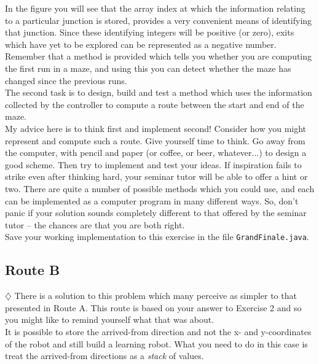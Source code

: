 \noindent
In the figure you will see that the array index at which the information relating
to a particular junction is stored, provides a very
convenient means of identifying that junction. Since these identifying
integers will be positive (or zero), exits which have yet to be explored can
be represented as a negative number. Remember that a method is
provided which tells you whether you are computing the first run
in a maze, and using this you can detect whether the maze has changed since 
the previous runs. \\

\noindent
The second task is to
design, build and test a method which uses the information collected by
the controller to compute a route between the start and end of the maze. \\

\noindent
My advice here is to think first and implement second! Consider how you might
represent and compute such a route. Give yourself time to think. Go away from
the computer, with pencil and paper (or coffee, or beer, whatever...) to 
design a good scheme. Then try to implement and test your ideas. If inspiration
fails to strike even after thinking hard, your seminar tutor will be able to
offer a hint or two. There are quite a number of possible methods which you could
use, and each can be implemented as a computer program in many different
ways. So, don't panic if your solution sounds completely different to that 
offered by the seminar tutor -- the chances are that you are both right. \\

\noindent
Save your working implementation to this exercise in the file 
{\tt GrandFinale.java}.

\subsection{Route B}

$\diamondsuit$
There is a solution to this problem which many perceive as simpler to that 
presented in Route A. This route is based on your answer to Exercise 2 and 
so you might like to remind yourself what that was about.\\

\noindent
It is possible to store the arrived-from direction and not the x- and 
y-coordinates of the robot and still build a learning robot. What you need to 
do in this case is treat the arrived-from directions as a {\em stack} of 
values. \\

